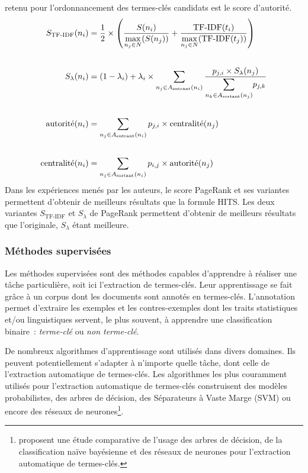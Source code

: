           retenu pour l'ordonnancement des termes-clés candidats est le score
          d'autorité.
          \begin{align}
            S_{\text{TF-IDF}}(n_i) &= \frac{1}{2} \times \left(\frac{S(n_i)}{\mathlarger{\max}_{n_j \in N}(S(n_j))} + \frac{\text{TF-IDF}(t_i)}{\mathlarger{\max}_{n_j \in N}(\text{TF-IDF}(t_j))}\right) \label{math:apw}\\
            \notag\\
            S_{\lambda}(n_i) &= (1 - \lambda_i) + \lambda_i \times \sum_{n_j \in A_{\text{entrant}}(n_i)} \frac{p_{j, i} \times S_{\lambda}(n_j)}{\mathlarger{\sum}_{n_k \in A_{\text{sortant}}(n_j)} p_{j, k}} \label{math:ppr}\\
            \notag\\
            \text{autorité}(n_i) &= \sum_{n_j \in A_{\text{entrant}}(n_i)}p_{j, i} \times \text{centralité}(n_j) \label{math:hitsauthority}\\
            \notag\\
            \text{centralité}(n_i) &= \sum_{n_j \in A_{\text{sortant}}(n_i)}p_{i, j} \times \text{autorité}(n_j) \label{math:hitshub}
          \end{align}
          Dans les expériences menés par les auteurs, le score PageRank et ses
          variantes permettent d'obtenir de meilleurs résultats que la formule
          HITS. Les deux variantes $S_{\text{TF-IDF}}$ et $S_{\lambda}$ de
          PageRank permettent d'obtenir de meilleurs résultats que l'originale,
          $S_{\lambda}$ étant meilleure.

      \subsubsection{Méthodes supervisées}
      \label{sec:supervised_methods}
        Les méthodes supervisées sont des méthodes capables d'apprendre à
        réaliser une tâche particulière, soit ici l'extraction de termes-clés.
        Leur apprentissage se fait grâce à un corpus dont les documents sont
        annotés en termes-clés. L'annotation permet d'extraire les exemples et
        les contres-exemples dont les traits statistiques et/ou linguistiques
        servent, le plus souvent, à apprendre une classification binaire~:
        \textit{terme-clé} ou \textit{non terme-clé}.

        De nombreux algorithmes d'apprentissage sont utilisés dans divers
        domaines. Ils peuvent potentiellement s'adapter à n'importe quelle
        tâche, dont celle de l'extraction automatique de termes-clés. Les
        algorithmes les plus couramment utilisés pour l'extraction automatique
        de termes-clés construisent des modèles probabilistes, des arbres de
        décision, des Séparateurs à Vaste Marge (SVM) ou encore des réseaux de
        neurones\footnote{\citet{sarkar2012machinelearningcomparison} proposent
        une étude comparative de l'usage des arbres de décision, de la
        classification naïve bayésienne et des réseaux de neurones pour
        l'extraction automatique de termes-clés.}.

